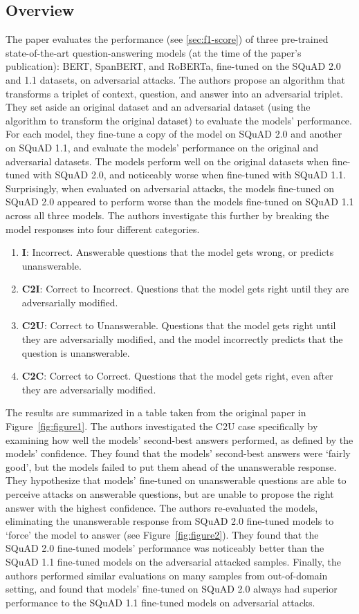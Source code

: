 \documentclass[letterpaper, 11pt]{article}
\begin{document}
\subsection{Overview}
The paper evaluates the performance (see \ref{sec:f1-score}) of three pre-trained state-of-the-art question-answering models (at the time of the paper's publication): BERT, SpanBERT, and RoBERTa, fine-tuned on the SQuAD 2.0 and 1.1 datasets, on adversarial attacks.
The authors propose an algorithm that transforms a triplet of context, question, and answer into an adversarial triplet. They set aside an original dataset and an adversarial dataset (using the algorithm to transform the original dataset) to evaluate the models' performance.
For each model, they fine-tune a copy of the model on SQuAD 2.0 and another on SQuAD 1.1, and evaluate the models' performance on the original and adversarial datasets. The models perform well on the original datasets when fine-tuned with SQuAD 2.0, and noticeably worse when fine-tuned with SQuAD 1.1.
Surprisingly, when evaluated on adversarial attacks, the models fine-tuned on SQuAD 2.0 appeared to perform worse than the models fine-tuned on SQuAD 1.1 across all three models. The authors investigate this further by breaking the model responses into four different categories.
\begin{enumerate}
    \item \textbf{I}: Incorrect. Answerable questions that the model gets wrong, or predicts unanswerable.
    \item \textbf{C2I}: Correct to Incorrect. Questions that the model gets right until they are adversarially modified.
    \item \textbf{C2U}: Correct to Unanswerable. Questions that the model gets right until they are adversarially modified, and the model incorrectly predicts that the question is unanswerable.
    \item \textbf{C2C}: Correct to Correct. Questions that the model gets right, even after they are adversarially modified.
\end{enumerate}

The results are summarized in a table taken from the original paper in Figure~\ref{fig:figure1}. The authors investigated the C2U case specifically by examining how well the models' second-best answers performed, as defined by the models' confidence.
They found that the models' second-best answers were `fairly good', but the models failed to put them ahead of the unanswerable response. They hypothesize that models' fine-tuned on unanswerable questions are able to perceive attacks on answerable questions,
but are unable to propose the right answer with the highest confidence. 
The authors re-evaluated the models, eliminating the unanswerable response from SQuAD 2.0 fine-tuned models to `force' the model to answer (see Figure~\ref{fig:figure2}). They found that the SQuAD 2.0 fine-tuned models' performance was noticeably better than the SQuAD 1.1 fine-tuned models on the adversarial attacked samples. 
Finally, the authors performed similar evaluations on many samples from out-of-domain setting, and found that models' fine-tuned on SQuAD 2.0 always had superior performance to the SQuAD 1.1 fine-tuned models on adversarial attacks. 
\end{document}
